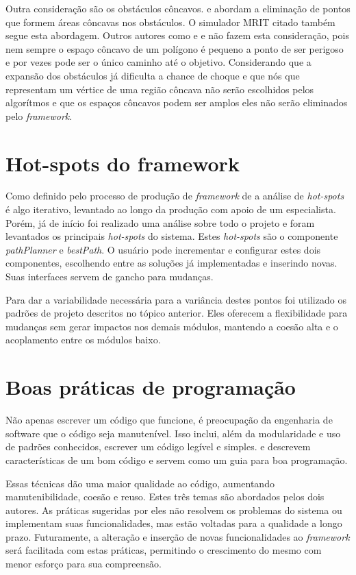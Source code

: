 Outra consideração são os obstáculos côncavos. \cite{Siegwart2004} e \cite{Guzman2008} abordam a eliminação de pontos que formem áreas côncavas nos obstáculos. O simulador MRIT citado também segue esta abordagem. Outros autores como \cite{Thomsen2010} e \cite{Choset2005} e  não fazem esta consideração, pois nem sempre o espaço côncavo de um polígono é pequeno a ponto de ser perigoso e por vezes pode ser o único caminho até o objetivo. Considerando que a expansão dos obstáculos já dificulta a chance de choque e que nós que representam um vértice de uma região côncava não serão escolhidos pelos algorítmos e que os espaços côncavos podem ser amplos eles não serão eliminados pelo \textit{framework}.

\section{Hot-spots do framework}

Como definido pelo processo de produção de \textit{framework} de \cite{Fayad1999} a análise de \textit{hot-spots} é algo iterativo, levantado ao longo da produção com apoio de um especialista. Porém, já de início foi realizado uma análise sobre todo o projeto e foram levantados os principais \textit{hot-spots} do sistema. Estes \textit{hot-spots} são o componente \textit{pathPlanner} e \textit{bestPath}. O usuário pode incrementar e configurar estes dois componentes, escolhendo entre as soluções já implementadas e inserindo novas. Suas interfaces servem de gancho para mudanças.

Para dar a variabilidade necessária para a variância destes pontos foi utilizado os padrões de projeto descritos no tópico anterior. Eles oferecem a flexibilidade para mudanças sem gerar impactos nos demais módulos, mantendo a coesão alta e o acoplamento entre os módulos baixo.

\section{Boas práticas de programação}

Não apenas escrever um código que funcione, é preocupação da engenharia de software que o código seja manutenível. Isso inclui, além da modularidade e uso de padrões conhecidos, escrever um código legível e simples. \cite{Goodliffe2007} e \cite{McConnel2004} descrevem características de um bom código e servem como um guia para boa programação.

Essas técnicas dão uma maior qualidade ao código, aumentando manutenibilidade, coesão e reuso. Estes três temas são abordados pelos dois autores. As práticas sugeridas por eles não resolvem os problemas do sistema ou implementam suas funcionalidades, mas estão voltadas para a qualidade a longo prazo. Futuramente, a alteração e inserção de novas funcionalidades ao \textit{framework} será facilitada com estas práticas, permitindo o crescimento do mesmo com menor esforço para sua compreensão.

